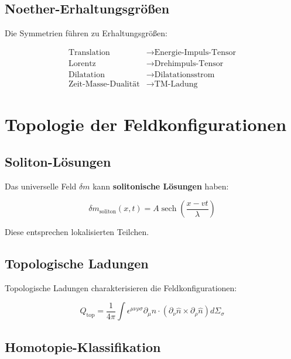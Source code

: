 \documentclass[12pt,a4paper]{report}
\begin{document}
	\subsection{Noether-Erhaltungsgrößen}
	
	Die Symmetrien führen zu Erhaltungsgrößen:
	
	\begin{align}
		\text{Translation} &\to \text{Energie-Impuls-Tensor} \\
		\text{Lorentz} &\to \text{Drehimpuls-Tensor} \\
		\text{Dilatation} &\to \text{Dilatationsstrom} \\
		\text{Zeit-Masse-Dualität} &\to \text{TM-Ladung}
	\end{align}
	
	\section{Topologie der Feldkonfigurationen}
	
	\subsection{Soliton-Lösungen}
	
	Das universelle Feld $\delta m$ kann \textbf{solitonische Lösungen} haben:
	
	\begin{equation}
		\delta m_{\text{soliton}}(x,t) = A \operatorname{sech}\left(\frac{x-vt}{\lambda}\right)
	\end{equation}
	
	Diese entsprechen lokalisierten Teilchen.
	
	\subsection{Topologische Ladungen}
	
	Topologische Ladungen charakterisieren die Feldkonfigurationen:
	
	\begin{equation}
		Q_{\text{top}} = \frac{1}{4\pi} \int \epsilon^{\mu\nu\rho\sigma} \partial_\mu \hat{n} \cdot (\partial_\nu \hat{n} \times \partial_\rho \hat{n}) d\Sigma_\sigma
	\end{equation}
	
	\subsection{Homotopie-Klassifikation}
	
\end{document}
